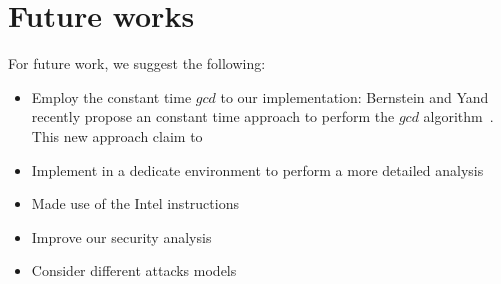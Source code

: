 \section{Future works}
For future work, we suggest the following:

\begin{itemize}
    \item Employ the constant time $gcd$ to our implementation: Bernstein and Yand recently propose an constant time approach to perform the $gcd$ algorithm~\cite{Bernstein_Yang_2019}. This new approach claim to 
    \item Implement in a dedicate environment to perform a more detailed analysis
    \item Made use of the Intel instructions
    \item Improve our security analysis
    \item Consider different attacks models
\end{itemize}